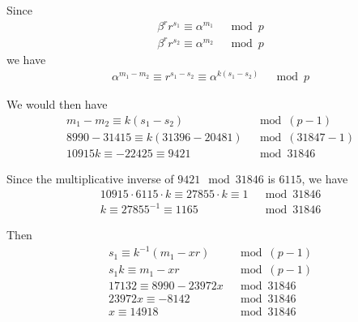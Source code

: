 \documentclass[11pt,a4paper]{article}
\begin{document}
\begin{enumerate}
\par Since
	\begin{align*}
	\beta^{r} r^{s_{1}} \equiv \alpha^{m_{1}} &\mod p \\
	\beta^{r} r^{s_{2}} \equiv \alpha^{m_{2}} &\mod p
	\end{align*}
we have
	\begin{align*}
	\alpha^{m_{1} - m_{2}} \equiv r^{s_{1} - s_{2}} \equiv \alpha^{k(s_{1} - s_{2})} &\mod p
	\end{align*}
\par We would then have
	\begin{align*}
	m_{1} - m_{2} \equiv k(s_{1} - s_{2}) &\mod (p - 1) \\
	8990 - 31415 \equiv k(31396 - 20481) &\mod (31847 - 1) \\
	10915k \equiv -22425 \equiv 9421‬ &\mod 31846
	\end{align*}
\par Since the multiplicative inverse of $9421 \mod 31846$ is $6115$, we have
	\begin{align*}
	10915 \cdot 6115 \cdot k \equiv 27855 \cdot k‬ \equiv 1 &\mod 31846 \\
	k \equiv 27855^{-1} \equiv 1165 &\mod 31846
	\end{align*}
\par Then
	\begin{align*}
	s_{1} \equiv k^{-1}(m_{1} - xr) &\mod (p-1) \\
	s_{1}k \equiv m_{1} - xr &\mod (p-1) \\
	17132 \equiv 8990 - 23972 x &\mod 31846 \\
	23972 x \equiv -8142 &\mod 31846 \\
	x \equiv 14918 &\mod 31846
	\end{align*}
\end{enumerate}
\end{document}
